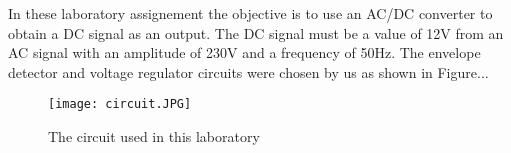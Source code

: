 In these laboratory assignement the objective is to use an AC/DC converter to obtain a DC signal as an output. The DC signal must be a value of 12V from an AC signal with an amplitude of 230V and a frequency of 50Hz. The envelope detector and voltage regulator circuits were chosen by us as shown in Figure... 


 \FloatBarrier 
 \begin{center}
\begin{figure}
  \texttt{[image: circuit.JPG]}
  \caption{The circuit used in this laboratory}
  \label{fig:circuit}
\end{figure}
\end{center}
\FloatBarrier


